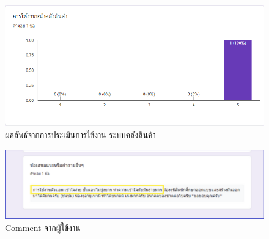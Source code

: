 \begin{figure}
  \begin{center}
    \includegraphics[width=\linewidth]{images/eval8.png}
  \end{center}
  \caption[ผลลัพธ์จากการประเมินการใช้งาน ระบบคลังสินค้า]{ผลลัพธ์จากการประเมินการใช้งาน ระบบคลังสินค้า}
  \label{fig:Eval8}
\end{figure}

\begin{figure}
  \begin{center}
    \includegraphics[width=\linewidth]{images/eval4.png}
  \end{center}
  \caption[Comment จากผู้ใช้งาน]{Comment จากผู้ใช้งาน}
  \label{fig:Eval4}
\end{figure}





